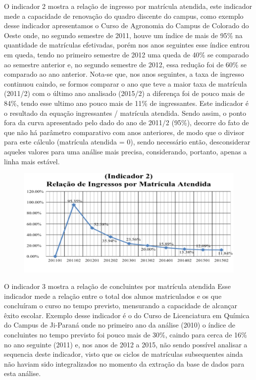 \documentclass[article,12pt,onesidea,4paper,english,brazil]{abntex2}
\begin{document}
	O indicador 2 mostra a relação de ingresso por matrícula atendida, este indicador mede a
	capacidade de renovação do quadro discente do campus, como exemplo desse indicador
	apresentamos o Curso de Agronomia do Campus de Colorado do Oeste onde, no segundo
	semestre de 2011, houve um índice de mais de 95\% na quantidade de matrículas efetivadas,
	porém nos anos seguintes esse índice entrou em queda, tendo no primeiro semestre de 2012 uma
	queda de 40\% se comparado ao semestre anterior e, no segundo semestre de 2012, essa redução
	foi de 60\% se comparado ao ano anterior. Nota-se que, nos anos seguintes, a taxa de ingresso
	continuou caindo, se formos comparar o ano que teve a maior taxa de matrícula (2011/2) com o
	último ano analisado (2015/2) a diferença foi de pouco mais de 84\%, tendo esse ultimo ano pouco
	mais de 11\% de ingressantes.
	Este indicador é o resultado da equação ingressantes / matrícula atendida. Sendo assim, o ponto
	fora da curva apresentado pelo dado do ano de 2011/2 (95\%), decorre do fato de que não há
	parâmetro comparativo com anos anteriores, de modo que o divisor para este cálculo (matrícula
	atendida = 0), sendo necessário então, desconsiderar aqueles valores para uma análise mais
	precisa, considerando, portanto, apenas a linha mais estável.
	
	\begin{figure}[ht]
		\centering
		\includegraphics[width=.9\linewidth]{PIP-97-2}
	\end{figure}
	
	O indicador 3 mostra a relação de concluintes por matrícula atendida Esse indicador mede
	a relação entre o total dos alunos matriculados e os que concluíram o curso no tempo previsto,
	mensurando a capacidade de alcançar êxito escolar. Exemplo desse indicador é o do Curso de
	Licenciatura em Química do Campus de Ji-Paraná onde no primeiro ano da análise (2010) o índice de concluintes no tempo previsto foi pouco mais de 30\%, caindo para cerca de 16\% no ano
	seguinte (2011) e, nos anos de 2012 a 2015, não sendo possível analisar a sequencia deste
	indicador, visto que os ciclos de matrículas subsequentes ainda não haviam sido integralizados no
	momento da extração da base de dados para esta análise.
	
\end{document}
